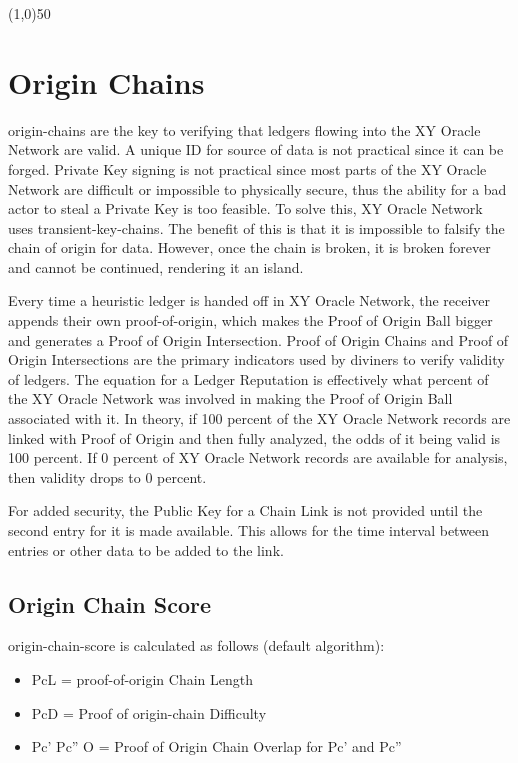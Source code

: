 \documentclass{article}
\begin{document}
\begin{center}
\line(1,0){50}
\end{center}

\section {Origin Chains}
\Glspl{origin-chain} are the key to verifying that ledgers flowing into the XY Oracle Network are valid. A unique ID for source of data is not practical since it can be forged. Private Key signing is not practical since most parts of the XY Oracle Network are difficult or impossible to physically secure, thus the ability for a bad actor to steal a Private Key is too feasible. To solve this, XY Oracle Network uses \Glspl{transient-key-chain}. The benefit of this is that it is impossible to falsify the chain of origin for data. However, once the chain is broken, it is broken forever and cannot be continued, rendering it an island. 

Every time a \gls{heuristic} ledger is handed off in XY Oracle Network, the receiver appends their own \Gls{proof-of-origin}, which makes the Proof of Origin Ball bigger and generates a Proof of Origin Intersection. Proof of Origin Chains and Proof of Origin Intersections are the primary indicators used by \Glspl{diviner} to verify validity of ledgers. The equation for a Ledger Reputation is effectively what percent of the XY Oracle Network was involved in making the Proof of Origin Ball associated with it. In theory, if 100 percent of the XY Oracle Network records are linked with Proof of Origin and then fully analyzed, the odds of it being valid is 100 percent. If 0 percent of XY Oracle Network records are available for analysis, then validity drops to 0 percent.

For added security, the Public Key for a Chain Link is not provided until the second entry for it is made available. This allows for the time interval between entries or other data to be added to the link.

\subsection {Origin Chain Score}
\Gls{origin-chain-score} is calculated as follows (default algorithm):

\begin{itemize}
\item PcL = \Gls{proof-of-origin} Chain Length
\item PcD = Proof of \Gls{origin-chain} Difficulty
\item Pc' Pc'' O = Proof of Origin Chain Overlap for Pc' and Pc''
\end{itemize}
\end{document}
